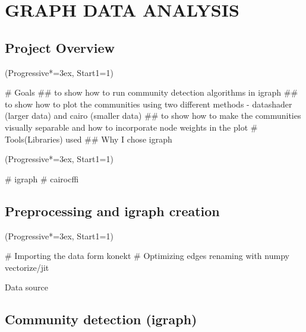 \documentclass[12pt, a4paper]{article}
\let\OldEasylist\easylist
\let\OldEndEasylist\endeasylist
\renewenvironment{easylist}{%
    \OldEasylist%
    \ListProperties(Progressive*=3ex, Start1=1)%
}{%
    \OldEndEasylist%
}%
\begin{document}
\newpage
\section{GRAPH DATA ANALYSIS}
\subsection{Project Overview}
\begin{easylist}
# Goals
## to show how to run community detection algorithms in igraph
## to show how to plot the communities using two different methods - datashader  (larger data) and cairo (smaller data)
## to show how to make the communities visually separable and how to incorporate node weights in the plot
# Tools(Libraries) used
## Why I chose igraph
\end{easylist}

\begin{easylist}
  # igraph
  # cairocffi
\end{easylist}

\cite{csardi2006igraph}

\newpage
\subsection{Preprocessing and igraph creation}
\begin{easylist}
# Importing the data form konekt
# Optimizing edges renaming with numpy vectorize/jit
\end{easylist}

Data source \cite{youtube_source}

\newpage
\subsection{Community detection (igraph)}

\newpage
\end{document}
